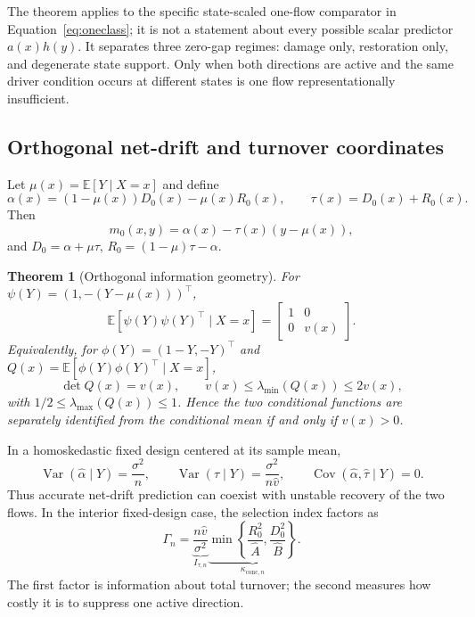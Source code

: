 \documentclass[twoside]{article}
\newcommand{\E}{\mathbb{E}}
\newcommand{\Var}{\operatorname{Var}}
\newcommand{\Cov}{\operatorname{Cov}}
\theoremstyle{plain}
\newtheorem{theorem}{Theorem}
\theoremstyle{definition}
\theoremstyle{remark}
\begin{document}
The theorem applies to the specific state-scaled one-flow comparator in
Equation~\eqref{eq:oneclass}; it is not a statement about every possible scalar
predictor \(a(x)h(y)\). It separates three zero-gap regimes: damage only,
restoration only, and degenerate state support. Only when both directions are
active and the same driver condition occurs at different states is one flow
representationally insufficient.

\subsection{Orthogonal net-drift and turnover coordinates}

Let \(\mu(x)=\E[Y\mid X=x]\) and define
\begin{equation}
\alpha(x)=(1-\mu(x))D_0(x)-\mu(x)R_0(x),
\qquad \tau(x)=D_0(x)+R_0(x).
\label{eq:alphatau}
\end{equation}
Then
\begin{equation}
m_0(x,y)=\alpha(x)-\tau(x)(y-\mu(x)),
\label{eq:orthogonal}
\end{equation}
and
\(D_0=\alpha+\mu\tau\),
\(R_0=(1-\mu)\tau-\alpha\).

\begin{theorem}[Orthogonal information geometry]
\label{thm:info}
For \(\psi(Y)=(1,-(Y-\mu(x)))^\top\),
\begin{equation}
\E[\psi(Y)\psi(Y)^\top\mid X=x]
=\begin{bmatrix}1&0\\0&v(x)\end{bmatrix}.
\label{eq:diaginfo}
\end{equation}
Equivalently, for \(\phi(Y)=(1-Y,-Y)^\top\) and
\(Q(x)=\E[\phi(Y)\phi(Y)^\top\mid X=x]\),
\begin{equation}
\det Q(x)=v(x),\qquad
v(x)\le\lambda_{\min}(Q(x))\le2v(x),
\label{eq:eig}
\end{equation}
with \(1/2\le\lambda_{\max}(Q(x))\le1\). Hence the two conditional
functions are separately identified from the conditional mean if and only if
\(v(x)>0\).
\end{theorem}

In a homoskedastic fixed design centered at its sample mean,
\begin{equation}
\Var(\widehat\alpha\mid Y)=\frac{\sigma^2}{n},\qquad
\Var(\widehat\tau\mid Y)=\frac{\sigma^2}{n\widehat v},\qquad
\Cov(\widehat\alpha,\widehat\tau\mid Y)=0.
\label{eq:alphatauvar}
\end{equation}
Thus accurate net-drift prediction can coexist with unstable recovery of the
two flows. In the interior fixed-design case, the selection index factors as
\begin{equation}
\Gamma_n=
\underbrace{\frac{n\widehat v}{\sigma^2}}_{I_{\tau,n}}
\underbrace{\min\!\left\{\frac{R_0^2}{\widehat A},
                              \frac{D_0^2}{\widehat B}\right\}}
_{\kappa_{\mathrm{conc},n}}.
\label{eq:factor}
\end{equation}
The first factor is information about total turnover; the second measures how
costly it is to suppress one active direction.
\end{document}
